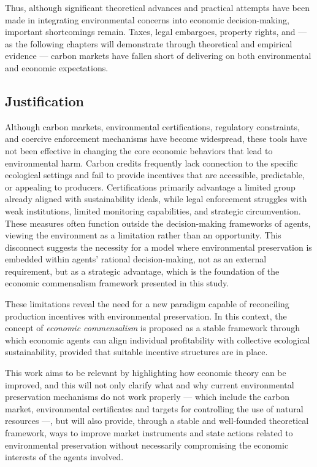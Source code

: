 Thus, although significant theoretical advances and practical attempts have been made in integrating environmental concerns into economic decision-making, important shortcomings remain. Taxes, legal embargoes, property rights, and — as the following chapters will demonstrate through theoretical and empirical evidence — carbon markets have fallen short of delivering on both environmental and economic expectations. 

\subsection{Justification}

Although carbon markets, environmental certifications, regulatory constraints, and coercive enforcement mechanisms have become widespread, these tools have not been effective in changing the core economic behaviors that lead to environmental harm. Carbon credits frequently lack connection to the specific ecological settings and fail to provide incentives that are accessible, predictable, or appealing to producers. Certifications primarily advantage a limited group already aligned with sustainability ideals, while legal enforcement struggles with weak institutions, limited monitoring capabilities, and strategic circumvention. These measures often function outside the decision-making frameworks of agents, viewing the environment as a limitation rather than an opportunity. This disconnect suggests the necessity for a model where environmental preservation is embedded within agents’ rational decision-making, not as an external requirement, but as a strategic advantage, which is the foundation of the economic commensalism framework presented in this study.

These limitations reveal the need for a new paradigm capable of reconciling production incentives with environmental preservation. In this context, the concept of \textit{economic commensalism} is proposed as a stable framework through which economic agents can align individual profitability with collective ecological sustainability, provided that suitable incentive structures are in place. 

This work aims to be relevant by highlighting how economic theory can be improved, and this will not only clarify what and why current environmental preservation mechanisms do not work properly — which include the carbon market, environmental certificates and targets for controlling the use of natural resources —, but will also provide, through a stable and well-founded theoretical framework, ways to improve market instruments and state actions related to environmental preservation without necessarily compromising the economic interests of the agents involved.


\newpage

